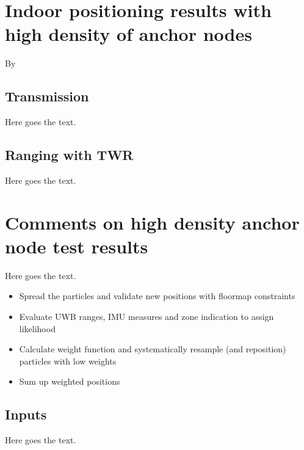 
\section{Indoor positioning results with high density of anchor nodes}
By 

\subsection{Transmission}
Here goes the text.
\subsection{Ranging with TWR}
Here goes the text.


\section{Comments on high density anchor node test results}
\label{Section4}
Here goes the text.
\begin{itemize}
\item Spread the particles and validate new positions with floormap constraints
\item Evaluate UWB ranges, IMU measures and zone indication to assign likelihood
\item Calculate weight function and systematically resample (and reposition) particles with low weights
\item Sum up weighted positions
\end{itemize}

\subsection{Inputs}
Here goes the text.



